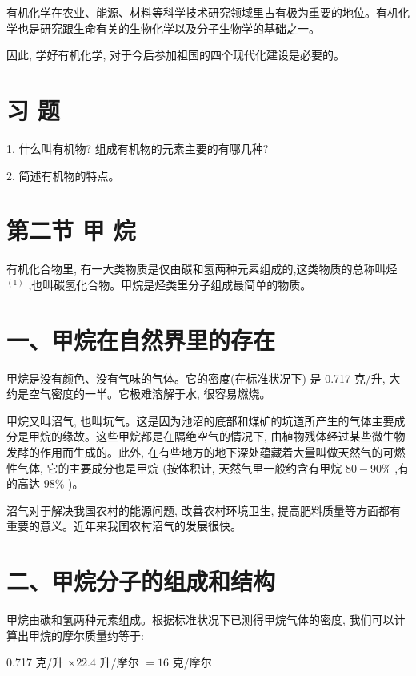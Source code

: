 \documentclass[10pt]{article}
\newcommand{\customfootnote}[1]{
  \let\thefootnote\relax\footnotetext{#1}
}
\begin{document}
有机化学在农业、能源、材料等科学技术研究领域里占有极为重要的地位。有机化学也是研究跟生命有关的生物化学以及分子生物学的基础之一。

因此, 学好有机化学, 对于今后参加祖国的四个现代化建设是必要的。

\section*{习 题}

1. 什么叫有机物? 组成有机物的元素主要的有哪几种?

2. 简述有机物的特点。

\section*{第二节 甲 烷}

有机化合物里, 有一大类物质是仅由碳和氢两种元素组成的,这类物质的总称叫烃 \({}^{\left( 1\right) }\) ,也叫碳氢化合物。甲烷是烃类里分子组成最简单的物质。

\section*{一、甲烷在自然界里的存在}

甲烷是没有颜色、没有气味的气体。它的密度(在标准状况下) 是 0.717 克/升, 大约是空气密度的一半。它极难溶解于水, 很容易燃烧。

\customfootnote{

① 经音 ting。

}

甲烷又叫沼气, 也叫坑气。这是因为池沼的底部和煤矿的坑道所产生的气体主要成分是甲烷的缘故。这些甲烷都是在隔绝空气的情况下, 由植物残体经过某些微生物发酵的作用而生成的。此外, 在有些地方的地下深处蕴藏着大量叫做天然气的可燃性气体, 它的主要成分也是甲烷 (按体积计, 天然气里一般约含有甲烷 \({80} - {90}\%\) ,有的高达 \({98}\%\) )。

沼气对于解决我国农村的能源问题, 改善农村环境卫生, 提高肥料质量等方面都有重要的意义。近年来我国农村沼气的发展很快。

\section*{二、甲烷分子的组成和结构}

甲烷由碳和氢两种元素组成。根据标准状况下已测得甲烷气体的密度, 我们可以计算出甲烷的摩尔质量约等于:

0.717 克/升 \(\times {22.4}\) 升/摩尔 \(= {16}\) 克/摩尔
\end{document}
